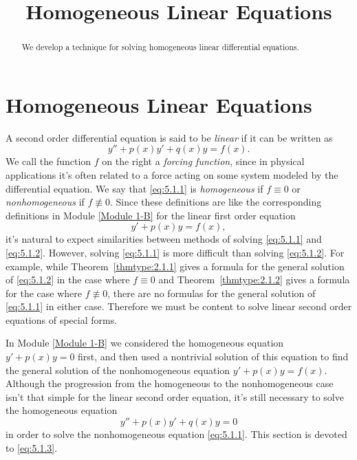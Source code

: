\documentclass{ximera}
\title{Homogeneous Linear Equations}%
\begin{document}
\begin{abstract}
We develop a technique for solving homogeneous linear differential equations.
\end{abstract}

\maketitle

\section*{Homogeneous Linear Equations}

A second order differential equation is said to be \textit{linear} if
it can be written as
\begin{equation}\label{eq:5.1.1}
y''+p(x)y'+q(x)y=f(x).
\end{equation}
We call the function $f$ on the right a \textit{forcing function},
since in physical applications it's often related to a force acting
on some system modeled by the differential equation. We say that
\eqref{eq:5.1.1} is \textit{homogeneous} if $f\equiv0$ or \textit{nonhomogeneous} if $f\not\equiv0$. Since these definitions are like
the corresponding definitions in Module \ref{Module 1-B} for the linear
first order equation
\begin{equation}\label{eq:5.1.2}
y'+p(x)y=f(x),
\end{equation}
it's natural to expect similarities between methods of solving
\eqref{eq:5.1.1} and \eqref{eq:5.1.2}. However, solving \eqref{eq:5.1.1} is more
difficult than solving \eqref{eq:5.1.2}. For example, while
Theorem~\ref{thmtype:2.1.1} gives a formula for the general solution of
\eqref{eq:5.1.2} in the case where $f\equiv0$ and
Theorem~\ref{thmtype:2.1.2} gives
a formula for the case where $f\not\equiv0$, there are no formulas for
the general solution of \eqref{eq:5.1.1} in either case. Therefore we must
be content to solve linear second order equations of special forms.

In Module \ref{Module 1-B} %
we considered the homogeneous equation
$y'+p(x)y=0$ first, and then used a nontrivial solution of this
equation to find the general solution of the nonhomogeneous equation
$y'+p(x)y=f(x)$. Although the progression from the homogeneous to the
nonhomogeneous case isn't  that simple for the linear second order
equation, it's still necessary to solve the homogeneous equation
\begin{equation}\label{eq:5.1.3}
y''+p(x)y'+q(x)y=0
\end{equation}
in order to solve the nonhomogeneous equation \eqref{eq:5.1.1}. This
section is devoted to \eqref{eq:5.1.3}.
\end{document}
